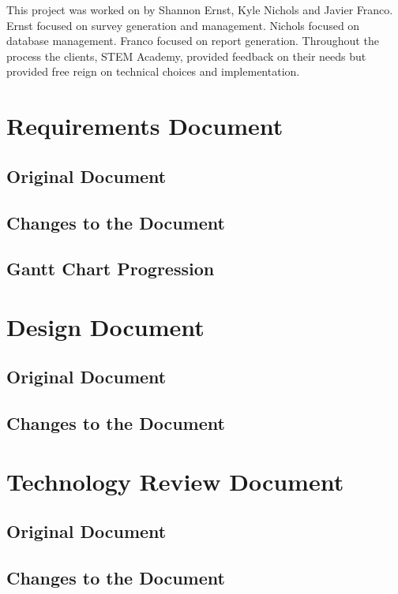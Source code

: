 \documentclass[letterpaper,10pt,serif,draftclsnofoot,onecolumn,compsoc,titlepage]{IEEEtran}
\begin{document}
This project was worked on by Shannon Ernst, Kyle Nichols and Javier Franco.
Ernst focused on survey generation and management. 
Nichols focused on database management.
Franco focused on report generation.
Throughout the process the clients, STEM Academy, provided feedback on their needs but provided free reign on technical choices and implementation. \\

\section{Requirements Document}
\subsection{Original Document}

%

\subsection{Changes to the Document}
\subsection{Gantt Chart Progression}

\section{Design Document}
\subsection{Original Document}

\subsection{Changes to the Document}


\section{Technology Review Document}
\subsection{Original Document}

\subsection{Changes to the Document}

\end{document}
